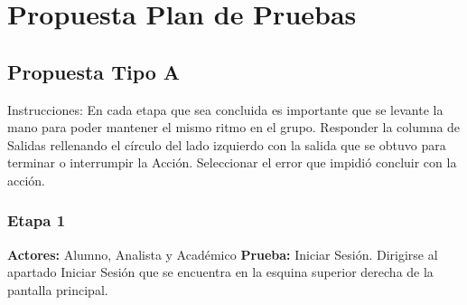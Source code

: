 \newpage
\chapter{Propuesta Plan de Pruebas}
\section{Propuesta Tipo A}
Instrucciones: En cada etapa que sea concluida es importante que se levante la mano para poder mantener el mismo ritmo en el grupo. Responder la columna de Salidas rellenando el círculo del lado izquierdo con la salida que se obtuvo para terminar o interrumpir la Acción. Seleccionar el error que impidió concluir con la acción.
\subsection*{Etapa 1}
\textbf{Actores:} Alumno, Analista y Académico\newline
\textbf{Prueba:} Iniciar Sesión.
Dirigirse al apartado Iniciar Sesión que se encuentra en la esquina superior derecha de la pantalla principal.
